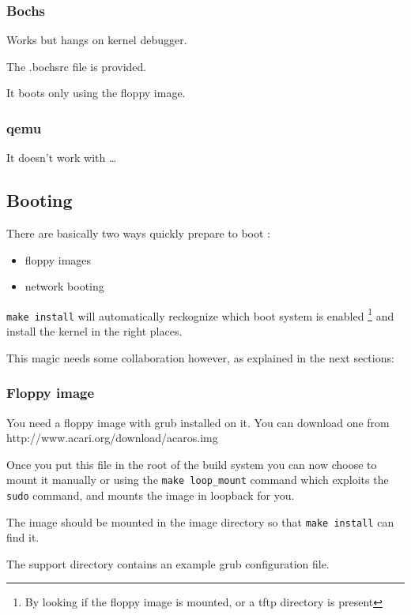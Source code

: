 \subsubsection{Bochs}

Works but hangs on kernel debugger.

The \textsf{.bochsrc} file is provided. 

It boots only using the floppy image.

\subsubsection{qemu}

It doesn't work with \acaros \ldots 

\subsection{Booting \acaros}

There are basically two ways quickly prepare to boot \acaros:
\begin{itemize}
\item floppy images
\item network booting
\end{itemize}

\texttt{make install} will automatically reckognize which boot system is enabled
\footnote{By looking if the floppy image is mounted, or a tftp directory is present} and
install the kernel in the right places. 

This magic needs some collaboration however, as explained in the next sections:

\subsubsection{Floppy image}

You need a floppy image with grub installed on it. You can download one 
from http://www.acari.org/download/acaros.img 

Once you put this file in the root of the build system you can now
choose to mount it manually or using the \texttt{make loop\_mount} command
which exploits the \texttt{sudo} command, and mounts the image in loopback for you.

The image should be mounted in the \textsf{image} directory so that \texttt{make install}
can find it.

The \textsf{support} directory contains an example grub configuration file.

